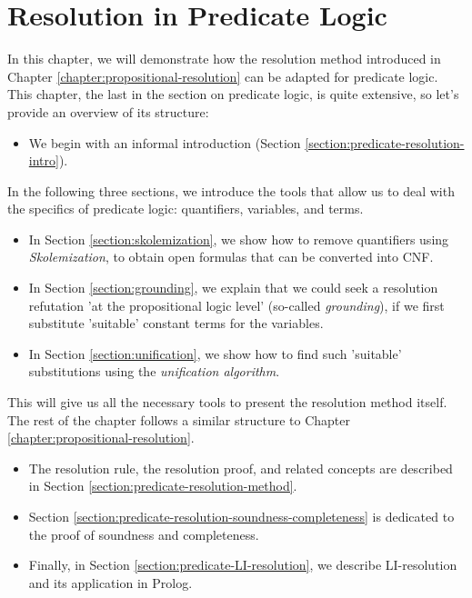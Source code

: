 \chapter{Resolution in Predicate Logic} 
\label{chapter:predicate-resolution}

In this chapter, we will demonstrate how the resolution method introduced in Chapter \ref{chapter:propositional-resolution} can be adapted for predicate logic. This chapter, the last in the section on predicate logic, is quite extensive, so let's provide an overview of its structure:

\begin{itemize}
    \item We begin with an informal introduction (Section \ref{section:predicate-resolution-intro}).
\end{itemize}
In the following three sections, we introduce the tools that allow us to deal with the specifics of predicate logic: quantifiers, variables, and terms.
\begin{itemize}
    \item In Section \ref{section:skolemization}, we show how to remove quantifiers using \emph{Skolemization}, to obtain open formulas that can be converted into CNF.
    \item In Section \ref{section:grounding}, we explain that we could seek a resolution refutation 'at the propositional logic level' (so-called \emph{grounding}), if we first substitute 'suitable' constant terms for the variables.
    \item In Section \ref{section:unification}, we show how to find such 'suitable' substitutions using the \emph{unification algorithm}.
\end{itemize}
This will give us all the necessary tools to present the resolution method itself. The rest of the chapter follows a similar structure to Chapter \ref{chapter:propositional-resolution}.
\begin{itemize}
    \item The resolution rule, the resolution proof, and related concepts are described in Section \ref{section:predicate-resolution-method}.
    \item Section \ref{section:predicate-resolution-soundness-completeness} is dedicated to the proof of soundness and completeness.
    \item Finally, in Section \ref{section:predicate-LI-resolution}, we describe LI-resolution and its application in Prolog.
\end{itemize}

